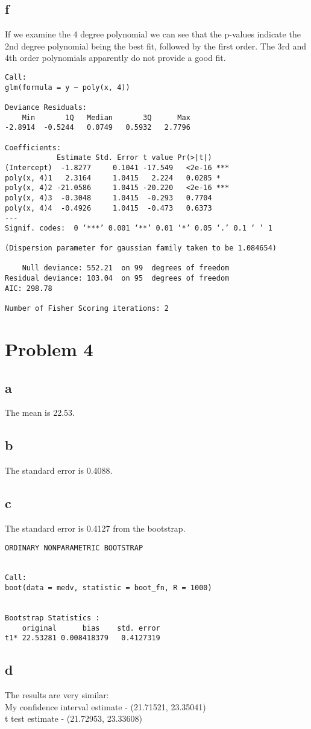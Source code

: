 \documentclass{article}
\begin{document}
\subsection*{f}
If we examine the 4 degree polynomial we can see that the p-values indicate the 2nd degree polynomial being the best fit, followed by the first order. The 3rd and 4th order polynomials apparently do not provide a good fit.\\
\begin{verbatim}
Call:
glm(formula = y ~ poly(x, 4))

Deviance Residuals: 
    Min       1Q   Median       3Q      Max  
-2.8914  -0.5244   0.0749   0.5932   2.7796  

Coefficients:
            Estimate Std. Error t value Pr(>|t|)    
(Intercept)  -1.8277     0.1041 -17.549   <2e-16 ***
poly(x, 4)1   2.3164     1.0415   2.224   0.0285 *  
poly(x, 4)2 -21.0586     1.0415 -20.220   <2e-16 ***
poly(x, 4)3  -0.3048     1.0415  -0.293   0.7704    
poly(x, 4)4  -0.4926     1.0415  -0.473   0.6373    
---
Signif. codes:  0 ‘***’ 0.001 ‘**’ 0.01 ‘*’ 0.05 ‘.’ 0.1 ‘ ’ 1

(Dispersion parameter for gaussian family taken to be 1.084654)

    Null deviance: 552.21  on 99  degrees of freedom
Residual deviance: 103.04  on 95  degrees of freedom
AIC: 298.78

Number of Fisher Scoring iterations: 2
\end{verbatim}

\section*{Problem 4}
\subsection*{a}
The mean is 22.53.\\
\subsection*{b}
The standard error is 0.4088.\\
\subsection*{c}
The standard error is 0.4127 from the bootstrap.\\
\begin{verbatim}
ORDINARY NONPARAMETRIC BOOTSTRAP


Call:
boot(data = medv, statistic = boot_fn, R = 1000)


Bootstrap Statistics :
    original      bias    std. error
t1* 22.53281 0.008418379   0.4127319
\end{verbatim}

\subsection*{d}
The results are very similar:\\
My confidence interval estimate - (21.71521, 23.35041)\\
t test estimate - (21.72953, 23.33608)\\
\end{document}
